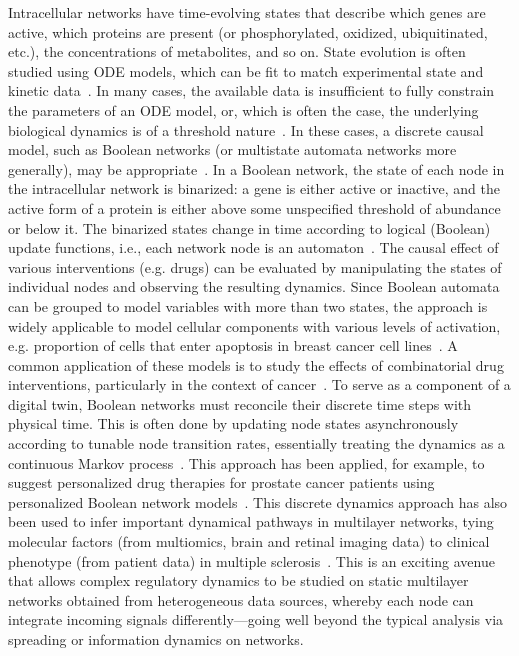 \documentclass[12pt]{article}
\renewcommand{\(}{\left(}
\renewcommand{\)}{\right)}
\renewcommand{\[}{\left[}
\renewcommand{\]}{\right]}
\begin{document}
Intracellular networks have time-evolving states that describe which genes are active, which proteins are present (or phosphorylated, oxidized, ubiquitinated, etc.), the concentrations of metabolites, and so on. State evolution is often studied using ODE models, which can be fit to match experimental state and kinetic data~\cite{mackeySimpleMathematicalModels2016}. In many cases, the available data is insufficient to fully constrain the parameters of an ODE model, or, which is often the case, the underlying biological dynamics is of a threshold nature~\cite{gates2021effective}.
%
In these cases, a discrete causal model, such as Boolean networks (or multistate automata networks more generally), may be appropriate~\cite{schwab2020ConceptsBooleanNetwork,rozum2024BooleanNetworksPredictivea}. In a Boolean network, the state of each node in the intracellular network is binarized: a gene is either active or inactive, and the active form of a protein is either above some unspecified threshold of abundance or below it. The binarized states change in time according to logical (Boolean) update functions, i.e., each network node is an automaton~\cite{marques2013canalization}.
%
The causal effect of various interventions (e.g. drugs) can be evaluated by manipulating the states of individual nodes and observing the resulting dynamics.
%
Since Boolean automata can be grouped to model variables with more than two states, the approach is widely applicable to model cellular components with various levels of activation, e.g. proportion of cells that enter apoptosis in breast cancer cell lines~\cite{gomeztejedazanudo2021CellLineSpecific}.
%
A common application of these models is to study the effects of combinatorial drug interventions, particularly in the context of cancer~\cite{gomeztejedazanudo2021CellLineSpecific,folkesson2023SynergisticEffectsComplex}. To serve as a component of a digital twin, Boolean networks must reconcile their discrete time steps with physical time. This is often done by updating node states asynchronously according to tunable node transition rates, essentially treating the dynamics as a continuous Markov process~\cite{calzone2022ModelingSignalingPathways}. This approach has been applied, for example, to suggest personalized drug therapies for prostate cancer patients using personalized Boolean network models~\cite{montagud2022PatientspecificBooleanModels}.
%
This discrete dynamics approach has also been used to infer important dynamical pathways in multilayer networks, tying molecular factors (from multiomics, brain and retinal imaging data) to clinical phenotype (from patient data) in multiple sclerosis~\cite{kennedy2024multiscale}. This is an exciting avenue that allows complex regulatory dynamics to be studied on static multilayer networks obtained from heterogeneous data sources, whereby each node can integrate incoming signals differently---going well beyond the typical analysis via spreading or information dynamics on networks.
\end{document}
